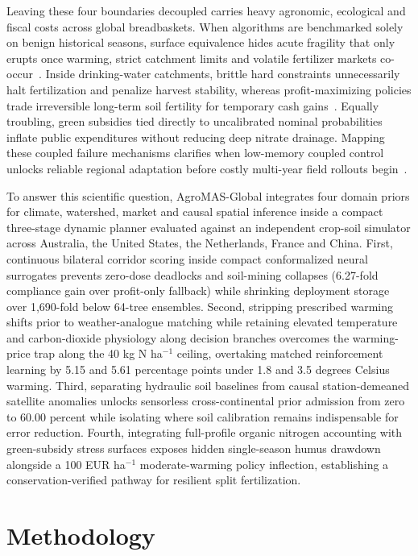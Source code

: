 \documentclass[11pt,a4paper]{article}
\begin{document}
Leaving these four boundaries decoupled carries heavy agronomic, ecological and fiscal costs across global breadbaskets. When algorithms are benchmarked solely on benign historical seasons, surface equivalence hides acute fragility that only erupts once warming, strict catchment limits and volatile fertilizer markets co-occur~\citep{baja2025}. Inside drinking-water catchments, brittle hard constraints unnecessarily halt fertilization and penalize harvest stability, whereas profit-maximizing policies trade irreversible long-term soil fertility for temporary cash gains~\citep{zhou2016,booth2023}. Equally troubling, green subsidies tied directly to uncalibrated nominal probabilities inflate public expenditures without reducing deep nitrate drainage. Mapping these coupled failure mechanisms clarifies when low-memory coupled control unlocks reliable regional adaptation before costly multi-year field rollouts begin~\citep{goldenits2024}.

To answer this scientific question, AgroMAS-Global integrates four domain priors for climate, watershed, market and causal spatial inference inside a compact three-stage dynamic planner evaluated against an independent crop-soil simulator across Australia, the United States, the Netherlands, France and China. First, continuous bilateral corridor scoring inside compact conformalized neural surrogates prevents zero-dose deadlocks and soil-mining collapses (6.27-fold compliance gain over profit-only fallback) while shrinking deployment storage over 1,690-fold below 64-tree ensembles. Second, stripping prescribed warming shifts prior to weather-analogue matching while retaining elevated temperature and carbon-dioxide physiology along decision branches overcomes the warming-price trap along the 40 kg N ha$^{-1}$ ceiling, overtaking matched reinforcement learning by 5.15 and 5.61 percentage points under 1.8 and 3.5 degrees Celsius warming. Third, separating hydraulic soil baselines from causal station-demeaned satellite anomalies unlocks sensorless cross-continental prior admission from zero to 60.00 percent while isolating where soil calibration remains indispensable for error reduction. Fourth, integrating full-profile organic nitrogen accounting with green-subsidy stress surfaces exposes hidden single-season humus drawdown alongside a 100 EUR ha$^{-1}$ moderate-warming policy inflection, establishing a conservation-verified pathway for resilient split fertilization.

\FloatBarrier

\section{Methodology}
\end{document}
